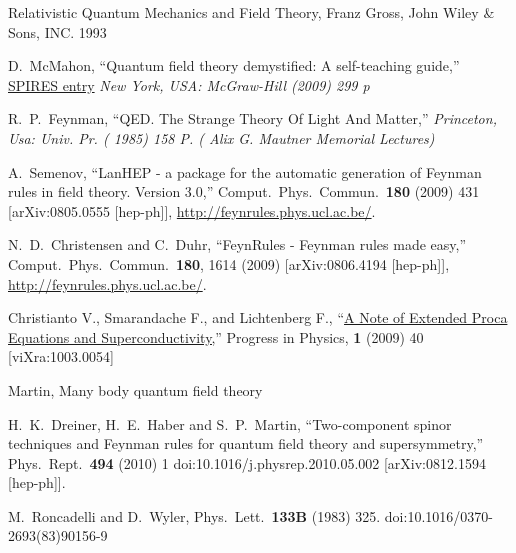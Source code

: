 \begin{thebibliography}{99}
Relativistic Quantum Mechanics and Field Theory, Franz Gross, John Wiley \& Sons, INC. 1993

  D.~McMahon,
  ``Quantum field theory demystified: A self-teaching guide,''
  \href{http://www.slac.stanford.edu/spires/find/hep/www?irn=8432112}{SPIRES entry}
{\it  New York, USA: McGraw-Hill (2009) 299 p}

  R.~P.~Feynman,
  ``QED. The Strange Theory Of Light And Matter,''
{\it  Princeton, Usa: Univ. Pr. ( 1985) 158 P. ( Alix G. Mautner Memorial Lectures)}


  A.~Semenov,
  ``LanHEP - a package for the automatic generation of Feynman rules in field
  theory. Version 3.0,''
  Comput.\ Phys.\ Commun.\  {\bf 180} (2009) 431
  [arXiv:0805.0555 [hep-ph]], \url{http://feynrules.phys.ucl.ac.be/}.

  N.~D.~Christensen and C.~Duhr,
  ``FeynRules - Feynman rules made easy,''
  Comput.\ Phys.\ Commun.\  {\bf 180}, 1614 (2009)
  [arXiv:0806.4194 [hep-ph]],
   \url{http://feynrules.phys.ucl.ac.be/}.

  Christianto V., Smarandache F., and Lichtenberg F., 
  ``\href{http://www.ptep-online.com/index_files/2009/PP-16-08.PDF}{A Note of Extended Proca Equations and Superconductivity,}''
  Progress in Physics, \textbf{1} (2009) 40
  [viXra:1003.0054]

Martin, Many body quantum field theory

  H.~K.~Dreiner, H.~E.~Haber and S.~P.~Martin,
  ``Two-component spinor techniques and Feynman rules for quantum field theory and supersymmetry,''
  Phys.\ Rept.\  {\bf 494} (2010) 1
  doi:10.1016/j.physrep.2010.05.002
  [arXiv:0812.1594 [hep-ph]].

  M.~Roncadelli and D.~Wyler,
  Phys.\ Lett.\  {\bf 133B} (1983) 325.
  doi:10.1016/0370-2693(83)90156-9
  
\end{thebibliography}

